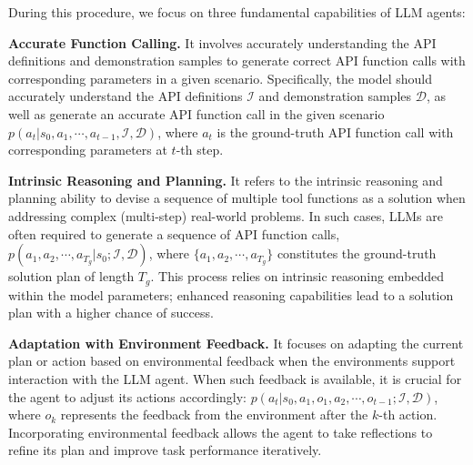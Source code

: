During this procedure, we focus on three fundamental capabilities of LLM agents:

\noindent \textbf{Accurate Function Calling.} It involves accurately understanding the API definitions and demonstration samples to generate correct API function calls with corresponding parameters in a given scenario.
Specifically, the model should accurately understand the API definitions $\mathcal{I}$ and demonstration samples $\mathcal{D}$, as well as generate an accurate API function call in the given scenario $p(a_t|s_0,a_1,\cdots,a_{t-1},\mathcal{I},\mathcal{D})$, where $a_t$ is the ground-truth API function call with corresponding parameters at $t$-th step.

\noindent \textbf{Intrinsic Reasoning and Planning.} It refers to the intrinsic reasoning and planning ability to devise a sequence of multiple tool functions as a solution when addressing complex (multi-step) real-world problems. In such cases, LLMs are often required to generate a sequence of API function calls, $p(a_1,a_2,\cdots,a_{T_g}|s_0;\mathcal{I},\mathcal{D})$, where $\{a_1,a_2,\cdots,a_{T_g}\}$ constitutes the ground-truth solution plan of length $T_g$.  
This process relies on intrinsic reasoning embedded within the model parameters; enhanced reasoning capabilities lead to a solution plan with a higher chance of success.


\noindent \textbf{Adaptation with Environment Feedback.} It focuses on adapting the current plan or action based on environmental feedback when the environments support interaction with the LLM agent. When such feedback is available, it is crucial for the agent to adjust its actions accordingly: $p(a_t|s_0,a_1,o_1,a_2,\cdots,o_{t-1};\mathcal{I},\mathcal{D})$,
where $o_{k}$ represents the feedback from the environment after the $k$-th action. 
Incorporating environmental feedback allows the agent to take reflections to refine its plan and improve task performance iteratively.

